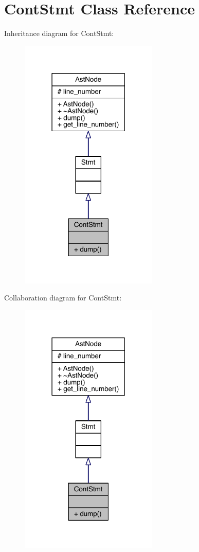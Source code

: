 \hypertarget{class_cont_stmt}{}\section{Cont\+Stmt Class Reference}
\label{class_cont_stmt}


Inheritance diagram for Cont\+Stmt\+:\nopagebreak
\begin{figure}[H]
\begin{center}
\leavevmode
\includegraphics[width=186pt]{class_cont_stmt__inherit__graph}
\end{center}
\end{figure}


Collaboration diagram for Cont\+Stmt\+:\nopagebreak
\begin{figure}[H]
\begin{center}
\leavevmode
\includegraphics[width=186pt]{class_cont_stmt__coll__graph}
\end{center}
\end{figure}
